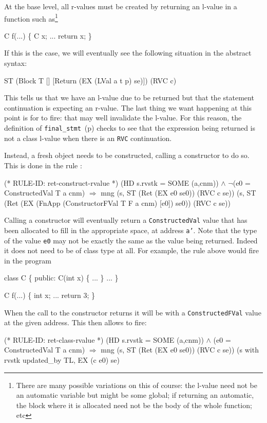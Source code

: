 \documentclass[11pt]{article}
\begin{document}
At the base level, all r-values must be created by returning an
l-value in a function such as\footnote{There are many possible
  variations on this of course: the l-value need not be an automatic
  variable but might be some global; if returning an automatic, the
  block where it is allocated need not be the body of the whole
  function; etc}
\begin{stdrule}
   C f(...)
   \{
     C x;
     ...
     return x;
   \}
\end{stdrule}
If this is the case, we will eventually see the following situation in
the abstract syntax:
\begin{stdrule}
   ST (Block T [] [Return (EX (LVal a t p) se)]) (RVC c)
\end{stdrule}
This tells us that we have an l-value due to be returned but that the
statement continuation is expecting an r-value.  The last thing we
want happening at this point is for
 to fire: that may well
invalidate the l-value.  For this reason, the definition of
\texttt{final_stmt}~(p\pageref{def:final-stmt}) checks to see that the
expression being returned is not a class l-value when there is an
\texttt{RVC} continuation.

Instead, a fresh object needs to be constructed, calling a constructor
to do so.  This is done in the rule
:%
\begin{stdrule}
(* RULE-ID: ret-construct-rvalue *)
     (HD s.rvstk = SOME (a,cnm)) \(\land\)
     \(\neg\)(e0 = ConstructedVal T a cnm)
   \(\Rightarrow\)
     mng (s, ST (Ret (EX e0 se0)) (RVC c se))
         (s, ST (Ret (EX (FnApp (ConstructorFVal T F a cnm) [e0])
                         se0))
                (RVC c se))
\end{stdrule}
Calling a constructor will eventually return a \texttt{ConstructedVal} value %
%
%
that has been allocated to fill in the appropriate space, at address
\texttt{a'}.  Note that the type of the value \texttt{e0} may not be
exactly the same as the value being returned.  Indeed it does not need
to be of class type at all.  For example, the rule above would fire in
the program
\begin{stdrule}
   class C \{
   public:
     C(int x) \{ ... \}
     ...
   \}

   C f(...) \{ int x; ... return 3; \}
\end{stdrule}
When the call to the constructor returns it will be with a
\texttt{ConstructedFVal} value at the given address.  This then allows
 to fire: %
%
\begin{stdrule}
(* RULE-ID: ret-class-rvalue *)
     (HD s.rvstk = SOME (a,cnm)) \(\land\)
     (e0 = ConstructedVal T a cnm)
   \(\Rightarrow\)
     mng (s, ST (Ret (EX e0 se0)) (RVC c se))
         (s with rvstk updated_by TL, EX (c e0) se)
\end{stdrule}
\end{document}
